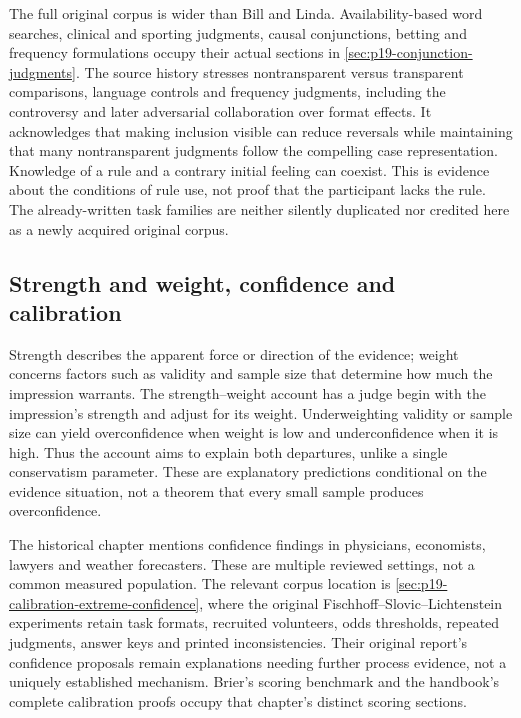 The full original corpus is wider than Bill and Linda. Availability-based
word searches, clinical and sporting judgments, causal conjunctions,
betting and frequency formulations occupy their actual sections in
\cref{sec:p19-conjunction-judgments}. The source history stresses
nontransparent versus transparent comparisons, language controls and
frequency judgments, including the controversy and later adversarial
collaboration over format effects. It acknowledges that making inclusion
visible can reduce reversals while maintaining that many nontransparent
judgments follow the compelling case representation. Knowledge of a
rule and a contrary initial feeling can coexist. This is evidence about
the conditions of rule use, not proof that the participant lacks the rule.
The already-written task families are neither silently duplicated nor
credited here as a newly acquired original corpus.

\subsection{Strength and weight, confidence and calibration}
\label{sec:p19-hph-confidence-place}

Strength describes the apparent force or direction of the evidence;
weight concerns factors such as validity and sample size that determine
how much the impression warrants. The strength--weight account has a
judge begin with the impression's strength and adjust for its weight.
Underweighting validity or sample size can yield overconfidence when
weight is low and underconfidence when it is high. Thus the account
aims to explain both departures, unlike a single conservatism parameter.
These are explanatory predictions conditional on the evidence situation,
not a theorem that every small sample produces overconfidence.

The historical chapter mentions confidence findings in physicians,
economists, lawyers and weather forecasters. These are multiple reviewed
settings, not a common measured population. The relevant corpus location
is \cref{sec:p19-calibration-extreme-confidence}, where the original
Fischhoff--Slovic--Lichtenstein experiments retain task formats, recruited
volunteers, odds thresholds, repeated judgments, answer keys and printed
inconsistencies. Their original report's confidence proposals remain
explanations needing further process evidence, not a uniquely established
mechanism. Brier's scoring benchmark and the handbook's complete
calibration proofs occupy that chapter's distinct scoring sections.


